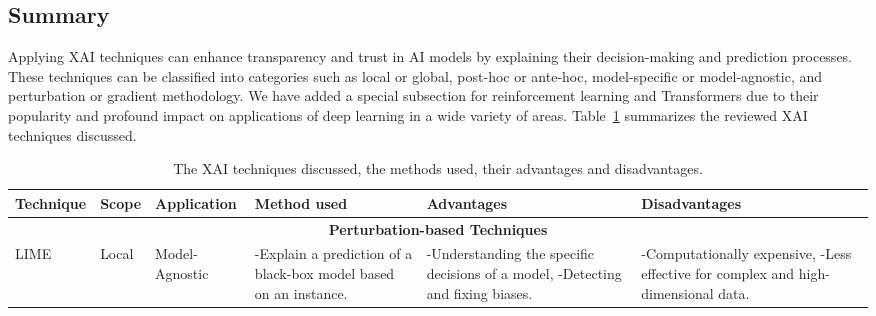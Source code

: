\documentclass[final,5p,times,twocolumn]{elsarticle}
\begin{document}
\subsection{Summary}
Applying XAI techniques can enhance transparency and trust in AI models by explaining their decision-making and prediction processes. These techniques can be classified into categories such as local or global, post-hoc or ante-hoc, model-specific or model-agnostic, and perturbation or gradient methodology. We have added a special subsection for reinforcement learning and Transformers due to their popularity and profound impact on applications of deep learning in a wide variety of areas. Table~\ref{tabSummaryXAItechniques} summarizes the reviewed XAI techniques discussed. 
\begin{table}[!h]
  \begin{center}
    \caption{The XAI techniques discussed, the methods used, their advantages and disadvantages.}        \label{tabSummaryXAItechniques}
    \begin{tabular}{m{40pt}|m{25pt}|m{45pt}|m{110pt}|m{70pt}|m{150pt}}\hline
        \textbf{Technique} & \textbf{Scope}&\textbf{Application}&\textbf{Method used}& \textbf{Advantages} & \textbf{Disadvantages} \\ \hline        
        \multicolumn{6}{c}{\textbf{Perturbation-based Techniques}}\\ \hline    
        LIME~\cite{ribeiro2016should} & Local &Model-Agnostic&-Explain a prediction of a black-box model based on an instance. &-Understanding the specific decisions of a model, \newline -Detecting and fixing biases.& -Computationally expensive, \newline -Less effective for complex and high-dimensional data. \\ \hline
   

\end{tabular}
\end{center}
\end{table}
\end{document}
